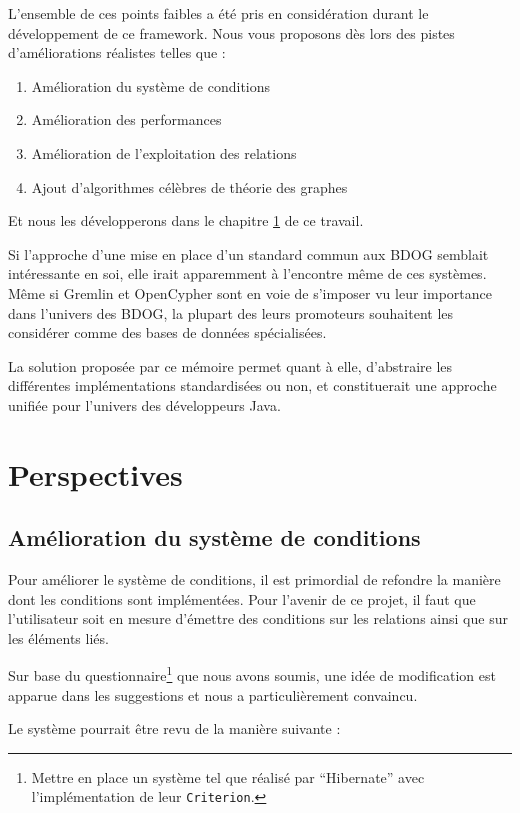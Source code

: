 \documentclass[a4paper,fleqn,12pt,oneside]{report}
\begin{document}
L'ensemble de ces points faibles a été pris en considération durant le développement de ce framework. Nous vous proposons dès lors des pistes d'améliorations réalistes telles que : 
\begin{enumerate}
\item Amélioration du système de conditions
\item Amélioration des performances
\item Amélioration de l'exploitation des relations
\item Ajout d'algorithmes célèbres de théorie des graphes
\end{enumerate}
 
Et nous les développerons dans le chapitre \ref{perspectives} de ce travail.

Si l'approche d'une mise en place d'un standard commun aux BDOG semblait intéressante en soi, elle irait apparemment à l'encontre même de ces systèmes. Même si Gremlin et OpenCypher sont en voie de s'imposer vu leur importance dans l'univers des BDOG, la plupart des leurs promoteurs souhaitent les considérer comme des bases de données spécialisées.

La solution proposée par ce mémoire permet quant à elle, d'abstraire les différentes implémentations standardisées ou non, et constituerait une approche unifiée pour l'univers des développeurs Java.

\chapter{Perspectives}
\label{perspectives}
\section{Amélioration du système de conditions}

Pour améliorer le système de conditions, il est primordial de refondre la manière dont les conditions sont implémentées. Pour l'avenir de ce projet, il faut que l'utilisateur soit en mesure d'émettre des conditions sur les relations ainsi que sur les éléments liés.

Sur base du questionnaire\footnote{Mettre en place un système tel que réalisé par \enquote{Hibernate} avec l'implémentation de leur \texttt{Criterion}.} que nous avons soumis, une idée de modification est apparue dans les suggestions et nous a particulièrement convaincu. 

Le système pourrait être revu de la manière suivante : 
\end{document}
